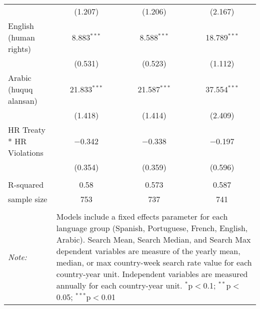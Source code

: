 \begin{table}[!htbp]
\begin{tabular}{@{\extracolsep{5pt}}lccc}
  & (1.207) & (1.206) & (2.167) \\ 
  English (human rights) & 8.883$^{***}$ & 8.588$^{***}$ & 18.789$^{***}$ \\ 
  & (0.531) & (0.523) & (1.112) \\ 
  Arabic (huquq alansan) & 21.833$^{***}$ & 21.587$^{***}$ & 37.554$^{***}$ \\ 
  & (1.418) & (1.414) & (2.409) \\ 
  HR Treaty * HR Violations & $-$0.342 & $-$0.338 & $-$0.197 \\ 
  & (0.354) & (0.359) & (0.596) \\ 
 \hline \\[-1.8ex] 
R-squared  & 0.58 & 0.573 & 0.587 \\ 
sample size  & 753 & 737 & 741 \\ 
\hline 
\hline \\[-1.8ex] 
\textit{Note:}  & \multicolumn{3}{l}{\parbox[t]{8cm}{Models include a fixed effects parameter for each language group (Spanish, Portuguese, French, English, Arabic). Search Mean, Search Median, and Search Max dependent variables are measure of the yearly mean, median, or max country-week search rate value for each country-year unit. Independent variables are measured annually for each country-year unit. $^{*}$p$<$0.1; $^{**}$p$<$0.05; $^{***}$p$<$0.01}} \\ 
\end{tabular} 
\end{table} 
